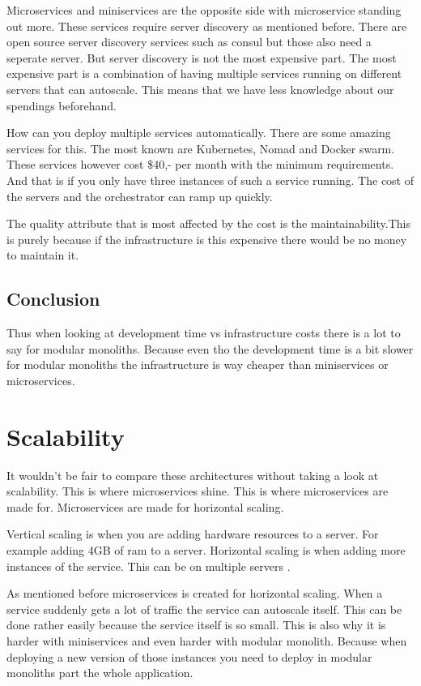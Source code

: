 Microservices and miniservices are the opposite side with microservice standing out more. These services require server discovery as mentioned before. There are open source server discovery services such as consul but those also need a seperate server. But server discovery is not the most expensive part. The most expensive part is a combination of having multiple services running on different servers that can autoscale. This means that we have less knowledge about our spendings beforehand.

How can you deploy multiple services automatically. There are some amazing services for this. The most known are Kubernetes, Nomad and Docker swarm. These services however cost \$40,- per month with the minimum requirements. And that is if you only have three instances of such a service running. The cost of the servers and the orchestrator can ramp up quickly.

The quality attribute that is most affected by the cost is the maintainability.This is purely because if the infrastructure is this expensive there would be no money to maintain it.

\subsection{Conclusion}
Thus when looking at development time vs infrastructure costs there is a lot to say for modular monoliths. Because even tho the development time is a bit slower for modular monoliths the infrastructure is way cheaper than miniservices or microservices.

\section{Scalability}
\label{sec:Scalability}

It wouldn’t be fair to compare these architectures without taking a look at scalability. This is where microservices shine. This is where microservices are made for. Microservices are made for horizontal scaling.

Vertical scaling is when you are adding hardware resources to a server. For example adding 4GB of ram to a server. Horizontal scaling is when adding more instances of the service. This can be on multiple servers \cite{microservicesMultipleServer}.

As mentioned before microservices is created for horizontal scaling. When a service suddenly gets a lot of traffic the service can autoscale itself. This can be done rather easily because the service itself is so small. This is also why it is harder with miniservices and even harder with modular monolith. Because when deploying a new version of those instances you need to deploy in modular monoliths part the whole application.

